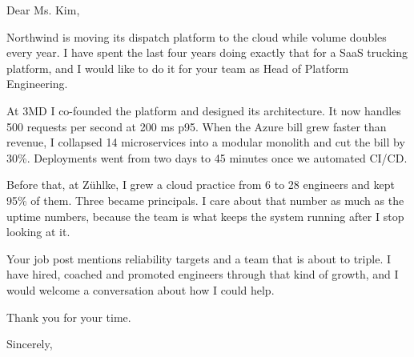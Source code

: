 \documentclass{milanovic-resume}
\begin{document}
\makeheader

\begin{letter}
Dear Ms. Kim,

Northwind is moving its dispatch platform to the cloud while volume doubles every year. I have spent the last
four years doing exactly that for a SaaS trucking platform, and I would like to do it for your team as Head of
Platform Engineering.

At 3MD I co-founded the platform and designed its architecture. It now handles 500 requests per second at
200 ms p95. When the Azure bill grew faster than revenue, I collapsed 14 microservices into a modular monolith
and cut the bill by 30\%. Deployments went from two days to 45 minutes once we automated CI/CD.

Before that, at Zühlke, I grew a cloud practice from 6 to 28 engineers and kept 95\% of them. Three became
principals. I care about that number as much as the uptime numbers, because the team is what keeps the
system running after I stop looking at it.

Your job post mentions reliability targets and a team that is about to triple. I have hired, coached and
promoted engineers through that kind of growth, and I would welcome a conversation about how I could help.

Thank you for your time.

Sincerely,
\signature{Dr. Milan Milanović}
\end{letter}
\end{document}
